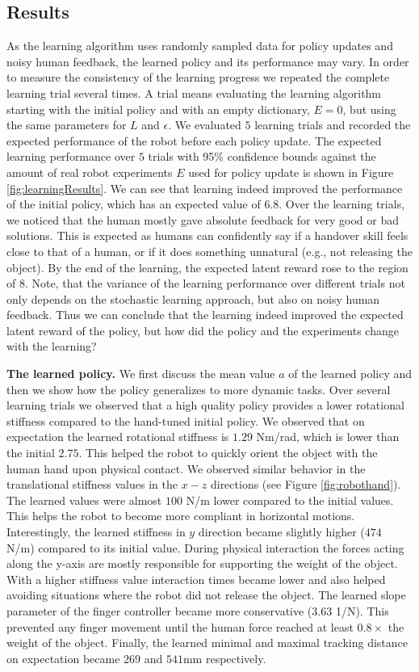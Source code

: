 \subsection{Results}

As the learning algorithm uses randomly sampled data for policy updates and noisy human feedback, the learned policy and its performance may vary. In order to measure the consistency of the learning progress we repeated the complete learning trial several times. A trial means evaluating the learning algorithm starting with the initial policy and with an empty dictionary, $E=0$, but using the same parameters for $L$ and $\epsilon$. 
We evaluated $5$ learning trials and recorded the expected performance of the robot before each policy update. The expected learning performance over $5$ trials with 95$\%$ confidence bounds against the amount of real robot experiments $E$ used for policy update is shown in Figure
\ref{fig:learningResults}. We can see that learning indeed improved the performance of the initial policy, which has an expected value of $6.8$. Over the learning trials, we noticed that the human mostly gave absolute feedback for very good or bad solutions. This is expected as humans can confidently say if a handover skill feels close to that of a human, or if it does something unnatural (e.g., not releasing the object). By the end of the learning, the expected latent reward rose to the region of $8$. Note, that the variance of the learning performance over different trials not only depends on the stochastic learning approach, but also on noisy human feedback. Thus we can conclude that the learning indeed improved the expected latent reward of the policy, but how did the policy and the experiments change with the learning?

\textbf{The learned policy.} We first discuss the mean value $a$ of the learned policy and then we show how the policy generalizes to more dynamic tasks. Over several learning trials we observed that a high quality policy provides a lower rotational stiffness compared to the hand-tuned initial policy. We observed that on expectation the learned rotational stiffness is $1.29$ Nm/rad, which is lower than the initial $2.75$. This helped the robot to quickly orient the object with the human hand upon physical contact. We observed similar behavior in the translational stiffness values in the $x-z$ directions (see Figure \ref{fig:robothand}). The learned values were almost $100$ N/m lower compared to the initial values. This helps the robot to become more compliant in horizontal motions. Interestingly, the learned stiffness in $y$ direction became slightly higher ($474$ N/m) compared to its initial value. During physical interaction the forces acting along the y-axis are mostly responsible for supporting the weight of the object. With a higher stiffness value interaction times became lower and also helped avoiding situations where the robot did not release the object. The learned slope parameter of the finger controller became more conservative ($3.63$ 1/N). This prevented any finger movement until the human force reached at least
$0.8\times$ the weight of the object. Finally, the learned minimal and maximal tracking distance on expectation became $269$ and $541$mm respectively. 

